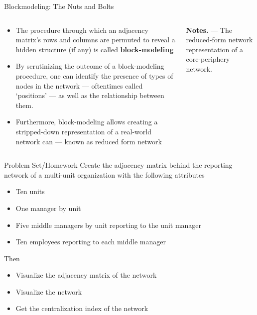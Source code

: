 \documentclass[notes, aspectratio=1610]{beamer}
\begin{document}
\begin{frame}{Blockmodeling: The Nuts and Bolts}{}
	\begin{columns}
		\small 
		\begin{column}{0.5\textwidth}
			\begin{itemize}
				\item 
				The procedure through which an adjacency matrix's rows and
				columns are permuted to reveal a hidden structure (if
				any) is called \textbf{block-modeling} \cite{peixoto2014}
				\item 
				By scrutinizing the outcome of a block-modeling procedure,
				one can identify the presence of types of nodes 
				in the network --- oftentimes called `positions' --- 
				as well as the relationship between them.
				\item 
				Furthermore, block-modeling allows creating 
				a stripped-down representation of a real-world network can 
				--- known as reduced form network
			\end{itemize}		
		\end{column}
		\begin{column}{0.5\textwidth}
			\centering

		\textbf{Notes.} --- The reduced-form network representation of a core-periphery 
		network.
		\end{column}
	\end{columns}
\end{frame}

\begin{frame}{Problem Set/Homework}{}
	Create the adjacency matrix behind the reporting network of a 
	multi-unit organization with the following attributes
	\begin{itemize}
		\item Ten units
		\item One manager by unit
		\item Five middle managers by unit reporting to the unit manager
		\item Ten employees reporting to each middle manager 
	\end{itemize}

	Then
	\begin{itemize}
		\item 
		Visualize the adjacency matrix of the network
		\item 
		Visualize the network
		\item 
		Get the centralization index of the network
	\end{itemize}
\end{frame}
\end{document}
